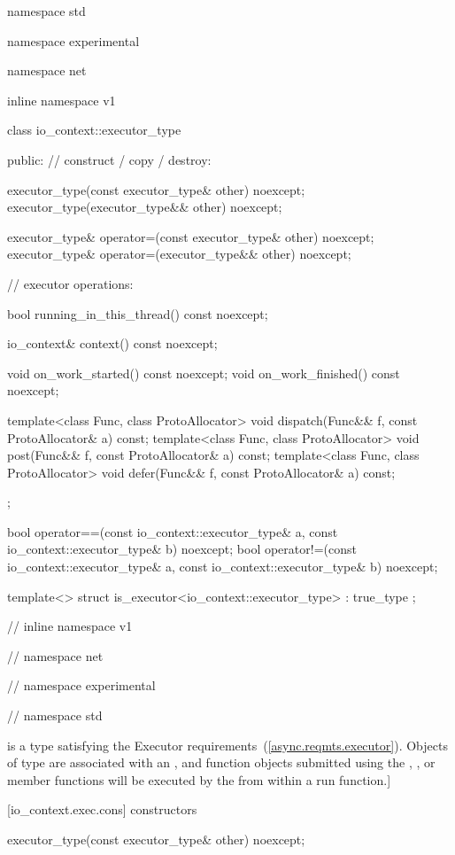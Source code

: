 %
\begin{codeblock}
namespace std {
namespace experimental {
namespace net {
inline namespace v1 {

  class io_context::executor_type
  {
  public:
    // construct / copy / destroy:

    executor_type(const executor_type& other) noexcept;
    executor_type(executor_type&& other) noexcept;

    executor_type& operator=(const executor_type& other) noexcept;
    executor_type& operator=(executor_type&& other) noexcept;

    // executor operations:

    bool running_in_this_thread() const noexcept;

    io_context& context() const noexcept;

    void on_work_started() const noexcept;
    void on_work_finished() const noexcept;

    template<class Func, class ProtoAllocator>
      void dispatch(Func&& f, const ProtoAllocator& a) const;
    template<class Func, class ProtoAllocator>
      void post(Func&& f, const ProtoAllocator& a) const;
    template<class Func, class ProtoAllocator>
      void defer(Func&& f, const ProtoAllocator& a) const;
  };

  bool operator==(const io_context::executor_type& a,
                  const io_context::executor_type& b) noexcept;
  bool operator!=(const io_context::executor_type& a,
                  const io_context::executor_type& b) noexcept;

  template<> struct is_executor<io_context::executor_type> : true_type {};

} // inline namespace v1
} // namespace net
} // namespace experimental
} // namespace std
\end{codeblock}

\pnum
{} is a type satisfying the Executor requirements~(\ref{async.reqmts.executor}). Objects of type  are associated with an , and function objects submitted using the , , or  member functions will be executed by the  from within a run function.]


[io_context.exec.cons]{ constructors}

%
\begin{itemdecl}
executor_type(const executor_type& other) noexcept;
\end{itemdecl}

